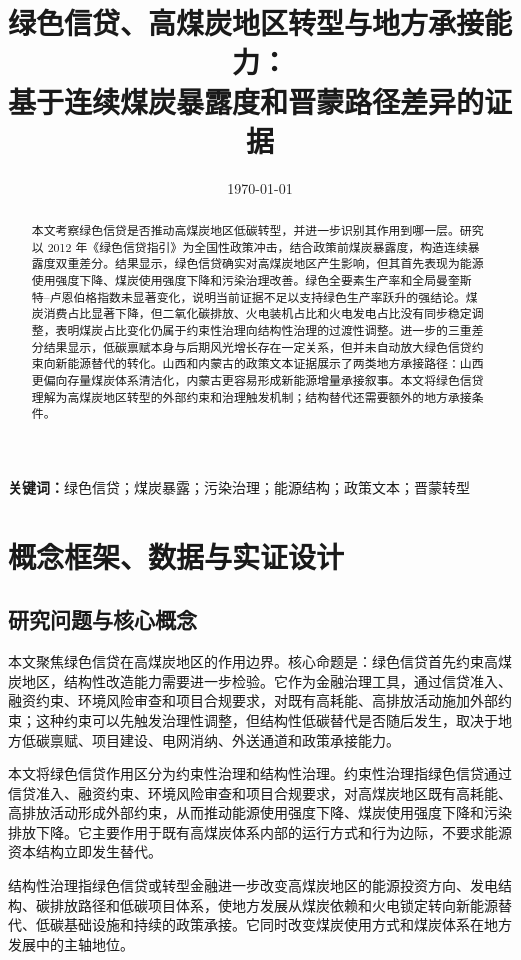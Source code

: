 \documentclass[UTF8,12pt]{ctexart}
\title{绿色信贷、高煤炭地区转型与地方承接能力：\\基于连续煤炭暴露度和晋蒙路径差异的证据}
\author{}
\date{\today}
\begin{document}
\maketitle

\begin{abstract}
本文考察绿色信贷是否推动高煤炭地区低碳转型，并进一步识别其作用到哪一层。研究以 2012 年《绿色信贷指引》为全国性政策冲击，结合政策前煤炭暴露度，构造连续暴露度双重差分。结果显示，绿色信贷确实对高煤炭地区产生影响，但其首先表现为能源使用强度下降、煤炭使用强度下降和污染治理改善。绿色全要素生产率和全局曼奎斯特--卢恩伯格指数未显著变化，说明当前证据不足以支持绿色生产率跃升的强结论。煤炭消费占比显著下降，但二氧化碳排放、火电装机占比和火电发电占比没有同步稳定调整，表明煤炭占比变化仍属于约束性治理向结构性治理的过渡性调整。进一步的三重差分结果显示，低碳禀赋本身与后期风光增长存在一定关系，但并未自动放大绿色信贷约束向新能源替代的转化。山西和内蒙古的政策文本证据展示了两类地方承接路径：山西更偏向存量煤炭体系清洁化，内蒙古更容易形成新能源增量承接叙事。本文将绿色信贷理解为高煤炭地区转型的外部约束和治理触发机制；结构替代还需要额外的地方承接条件。
\end{abstract}

\noindent\textbf{关键词：}绿色信贷；煤炭暴露；污染治理；能源结构；政策文本；晋蒙转型

\newpage

\section{概念框架、数据与实证设计}

\subsection{研究问题与核心概念}

本文聚焦绿色信贷在高煤炭地区的作用边界。核心命题是：绿色信贷首先约束高煤炭地区，结构性改造能力需要进一步检验。它作为金融治理工具，通过信贷准入、融资约束、环境风险审查和项目合规要求，对既有高耗能、高排放活动施加外部约束；这种约束可以先触发治理性调整，但结构性低碳替代是否随后发生，取决于地方低碳禀赋、项目建设、电网消纳、外送通道和政策承接能力。

本文将绿色信贷作用区分为约束性治理和结构性治理。约束性治理指绿色信贷通过信贷准入、融资约束、环境风险审查和项目合规要求，对高煤炭地区既有高耗能、高排放活动形成外部约束，从而推动能源使用强度下降、煤炭使用强度下降和污染排放下降。它主要作用于既有高煤炭体系内部的运行方式和行为边际，不要求能源资本结构立即发生替代。

结构性治理指绿色信贷或转型金融进一步改变高煤炭地区的能源投资方向、发电结构、碳排放路径和低碳项目体系，使地方发展从煤炭依赖和火电锁定转向新能源替代、低碳基础设施和持续的政策承接。它同时改变煤炭使用方式和煤炭体系在地方发展中的主轴地位。
\end{document}
